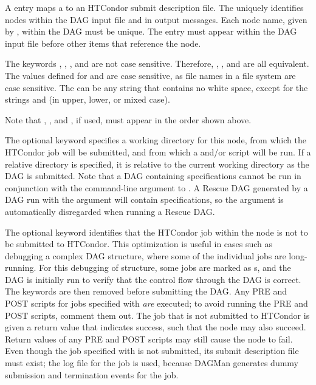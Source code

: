   
  

A  entry maps a  to an HTCondor submit description file.
The  uniquely identifies nodes within the
DAG input file and in output messages.
Each node name, given by , within the DAG must be unique.
The  entry must appear within the DAG input file before
other items that reference the node.

The keywords , , , and 
are not case sensitive.
Therefore, , , and  are all equivalent.
The values defined for  and 
are case sensitive, as file names 
in a file system are case sensitive.
The  can be any string that contains no white space, except
for the strings  and  (in upper, lower, or mixed
case).

Note that , , and , if used, must appear
in the order shown above.

The optional  keyword specifies a working directory
for this node,
from which the HTCondor job will be submitted,
and from which a  and/or
 script will be run.
If a relative directory is specified, it is relative to the current working 
directory as the DAG is submitted.
Note that a DAG containing  specifications cannot
be run in conjunction with the  command-line
argument to .  A Rescue DAG generated by
a DAG run with the  argument will contain
 specifications, so the  argument is
automatically disregarded when running a Rescue DAG.

\label{dagman:NOOP}
The optional  keyword identifies that the HTCondor job within
the node is not to be submitted to HTCondor.
This optimization is useful in cases such as debugging a complex DAG structure,
where some of the individual jobs are long-running.
For this debugging of structure,
some jobs are marked as s, and
the DAG is initially run to verify that the control flow through
the DAG is correct.
The  keywords are then removed before submitting the DAG.
Any PRE and POST scripts
for jobs specified with  \emph{are} executed;
to avoid running the PRE and POST scripts, comment them out.
The job that is not submitted to HTCondor is given a return value that indicates
success, such that the node may also succeed.
Return values of any 
PRE and POST scripts may still cause the node to fail.
Even though the job specified with  is not submitted,
its submit description file must exist;
the log file for the job is used, 
because DAGMan generates dummy submission and termination events for the job.

